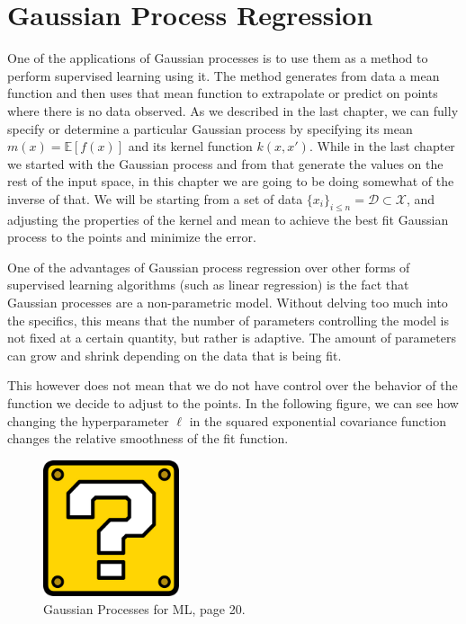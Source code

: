 \chapter{Gaussian Process Regression}

One of the applications of Gaussian processes is to use them as a method to perform supervised learning using it. The method generates from data a mean function and then uses that mean function to extrapolate or predict on points where there is no data observed. As we described in the last chapter, we can fully specify or determine a particular Gaussian process by specifying its mean $m(x) = \mathbb{E}[f(x)]$ and its kernel function $k(x,x')$. While in the last chapter we started with the Gaussian process and from that generate the values on the rest of the input space, in this chapter we are going to be doing somewhat of the inverse of that. We will be starting from a set of data $\{ x_i \}_{i \leq n} = \mathcal{D} \subset \mathcal{X}$, and adjusting the properties of the kernel and mean to achieve the best fit Gaussian process to the points and minimize the error. 

One of the advantages of Gaussian process regression over other forms of supervised learning algorithms (such as linear regression) is the fact that Gaussian processes are a non-parametric model. Without delving too much into the specifics, this means that the number of parameters controlling the model is not fixed at a certain quantity, but rather is adaptive. The amount of parameters can grow and shrink depending on the data that is being fit. 

This however does not mean that we do not have control over the behavior of the function we decide to adjust to the points. In the following figure, we can see how changing the hyperparameter $\ell$ in the squared exponential covariance function changes the relative smoothness of the fit function. 

\begin{figure}[h]
	\includegraphics[width=4cm]{Figures/missing.png}
	\centering
	\caption{Gaussian Processes for ML, page 20.}
	\label{trajectories}
\end{figure}

